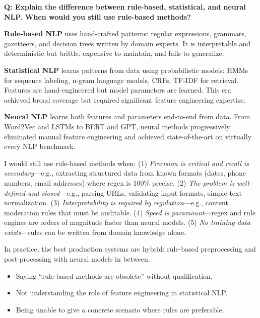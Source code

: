 \begin{interviewq}
\end{interviewq}

\vspace{0.5em}

\begin{interviewq}
\textbf{Q: Explain the difference between rule-based, statistical, and neural NLP. When would you still use rule-based methods?}

 \quad {} \quad \badgefreq{\freqhigh}

\stronganswer
\textbf{Rule-based NLP} uses hand-crafted patterns: regular expressions, grammars,
gazetteers, and decision trees written by domain experts. It is interpretable and
deterministic but brittle, expensive to maintain, and fails to generalize.

\textbf{Statistical NLP} learns patterns from data using probabilistic models: HMMs for
sequence labeling, n-gram language models, CRFs, TF-IDF for retrieval. Features are
hand-engineered but model parameters are learned. This era achieved broad coverage but
required significant feature engineering expertise.

\textbf{Neural NLP} learns both features and parameters end-to-end from data. From
Word2Vec and LSTMs to BERT and GPT, neural methods progressively eliminated manual feature
engineering and achieved state-of-the-art on virtually every NLP benchmark.

I would still use rule-based methods when: (1) \emph{Precision is critical and recall is
secondary}---e.g., extracting structured data from known formats (dates, phone numbers,
email addresses) where regex is 100\% precise. (2) \emph{The problem is well-defined and
closed}---e.g., parsing URLs, validating input formats, simple text normalization. (3)
\emph{Interpretability is required by regulation}---e.g., content moderation rules that must
be auditable. (4) \emph{Speed is paramount}---regex and rule engines are orders of
magnitude faster than neural models. (5) \emph{No training data exists}---rules can be
written from domain knowledge alone.

In practice, the best production systems are hybrid: rule-based preprocessing and
post-processing with neural models in between.

\redflags
\begin{itemize}
    \item Saying ``rule-based methods are obsolete'' without qualification.
    \item Not understanding the role of feature engineering in statistical NLP.
    \item Being unable to give a concrete scenario where rules are preferable.
\end{itemize}


\end{interviewq}
